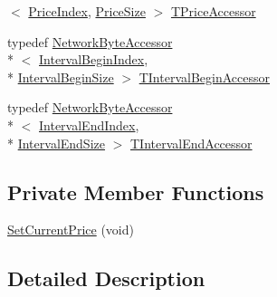 \begin{DoxyCompactItemize}
$<$ \hyperlink{class_terra_swarm_1_1_synchronous_1_1_set_current_price_a1e2f6ce793cf79b121b76b6903e9df58a5885a64cfebb23b330bc57406aeca87c}{Price\-Index}, \hyperlink{class_terra_swarm_1_1_synchronous_1_1_set_current_price_a8e183f6b467bff2559f766835197fb5da6d42507cf32e815416954a4126721a75}{Price\-Size} $>$ \hyperlink{class_terra_swarm_1_1_synchronous_1_1_set_current_price_a950c013f39e20f890173e81a716e3b6b}{T\-Price\-Accessor}
\item 
typedef \hyperlink{class_terra_swarm_1_1_network_byte_accessor}{Network\-Byte\-Accessor}\\*
$<$ \hyperlink{class_terra_swarm_1_1_synchronous_1_1_set_current_price_a1e2f6ce793cf79b121b76b6903e9df58ad2470cb4012d8a03a476f2c0a7ed837d}{Interval\-Begin\-Index}, \\*
\hyperlink{class_terra_swarm_1_1_synchronous_1_1_set_current_price_a8e183f6b467bff2559f766835197fb5da53a8281758edfad40d43fba9a81dc5c5}{Interval\-Begin\-Size} $>$ \hyperlink{class_terra_swarm_1_1_synchronous_1_1_set_current_price_a2d095e9cd5341bca06b121f115875bcc}{T\-Interval\-Begin\-Accessor}
\item 
typedef \hyperlink{class_terra_swarm_1_1_network_byte_accessor}{Network\-Byte\-Accessor}\\*
$<$ \hyperlink{class_terra_swarm_1_1_synchronous_1_1_set_current_price_a1e2f6ce793cf79b121b76b6903e9df58a2a78676d8ac8e4de4e131d71736f086c}{Interval\-End\-Index}, \\*
\hyperlink{class_terra_swarm_1_1_synchronous_1_1_set_current_price_a8e183f6b467bff2559f766835197fb5da289d263a3891286fe193d5c69ad33691}{Interval\-End\-Size} $>$ \hyperlink{class_terra_swarm_1_1_synchronous_1_1_set_current_price_ada50db521ec8f4351b11c9e7a55191f6}{T\-Interval\-End\-Accessor}
\end{DoxyCompactItemize}
\subsection*{Private Member Functions}
\begin{DoxyCompactItemize}
\item 
\hyperlink{class_terra_swarm_1_1_synchronous_1_1_set_current_price_a1d8f82415c6d84a85176ee9f233288dd}{Set\-Current\-Price} (void)
\end{DoxyCompactItemize}


\subsection{Detailed Description}


